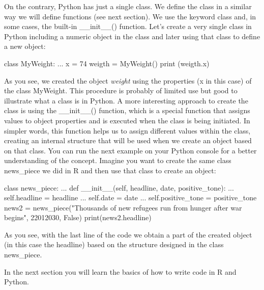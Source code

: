 On the contrary, Python has just a single class. We define the class in a similar way we will define functions (see next section). We use the keyword class and, in some cases, the built-in \_\_init\_\_() function.  Let's create a very single class in Python including a numeric object in the class and later using that class to define a new object:

\begin{examplepy}
class MyWeight:
...    	 x = 74
weigth = MyWeight()
print (weigth.x)
\end{examplepy}

As you see, we created the object \emph{weight} using the properties (x in this case) of the class MyWeight. This procedure is probably of limited use but good to illustrate what a class is in Python. A more interesting approach to create the class is using the \_\_init\_\_() function, which is a special function that assigns values to object properties and is executed when the class is being initiated. In simpler words, this function helps us to assign different values within the class, creating an internal structure that will be used when we create an object based on that class. You can run the next example on your Python console for a better understanding of the concept. Imagine you want to create the same class news\_piece we did in R and then use that class to create an object:

\begin{examplepy}
class news_piece:
...     def __init__(self, headline, date, positive_tone):
...             self.headline = headline
...             self.date = date
...             self.positive_tone = positive_tone
news2 = news_piece("Thousands of new refugees run from hunger after war begins", 22012030, False)
print(news2.headline)
\end{examplepy}

As you see, with the last line of the code we obtain a part of the created object (in this case the headline) based on the structure designed in the class news\_piece.

In the next section you will learn the basics of how to write code in R and Python.
